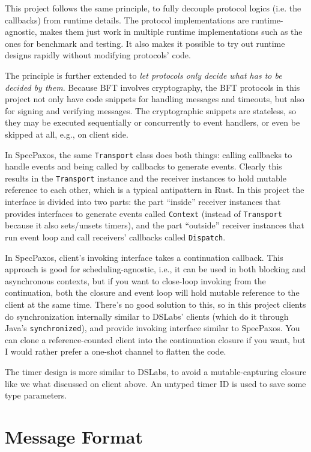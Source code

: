 \documentclass[acmsmall, nonacm, screen]{acmart}
\begin{document}
This project follows the same principle, to fully decouple protocol logics (i.e. the callbacks) from runtime details.
The protocol implementations are runtime-agnostic, makes them just work in multiple runtime implementations such as the ones for benchmark and testing.
It also makes it possible to try out runtime designs rapidly without modifying protocols' code.

The principle is further extended to \emph{let protocols only decide what has to be decided by them}.
Because BFT involves cryptography, the BFT protocols in this project not only have code snippets for handling messages and timeouts, but also for signing and verifying messages.
The cryptographic snippets are stateless, so they may be executed sequentially or concurrently to event handlers, or even be skipped at all, e.g., on client side.

In SpecPaxos, the same \texttt{Transport} class does both things: calling callbacks to handle events and being called by callbacks to generate events.
Clearly this results in the \texttt{Transport} instance and the receiver instances to hold mutable reference to each other, which is a typical antipattern in Rust.
In this project the interface is divided into two parts: the part ``inside'' receiver instances that provides interfaces to generate events called \texttt{Context} (instead of \texttt{Transport} because it also sets/unsets timers), and the part ``outside'' receiver instances that run event loop and call receivers' callbacks called \texttt{Dispatch}.

In SpecPaxos, client's invoking interface takes a continuation callback.
This approach is good for scheduling-agnostic, i.e., it can be used in both blocking and asynchronous contexts, but if you want to close-loop invoking from the continuation, both the closure and event loop will hold mutable reference to the client at the same time.
There's no good solution to this, so in this project clients do synchronization internally similar to DSLabs' clients (which do it through Java's \texttt{synchronized}), and provide invoking interface similar to SpecPaxos.
You can clone a reference-counted client into the continuation closure if you want, but I would rather prefer a one-shot channel to flatten the code.

The timer design is more similar to DSLabs, to avoid a mutable-capturing closure like we what discussed on client above.
An untyped timer ID is used to save some type parameters.

\section{Message Format}
\end{document}
